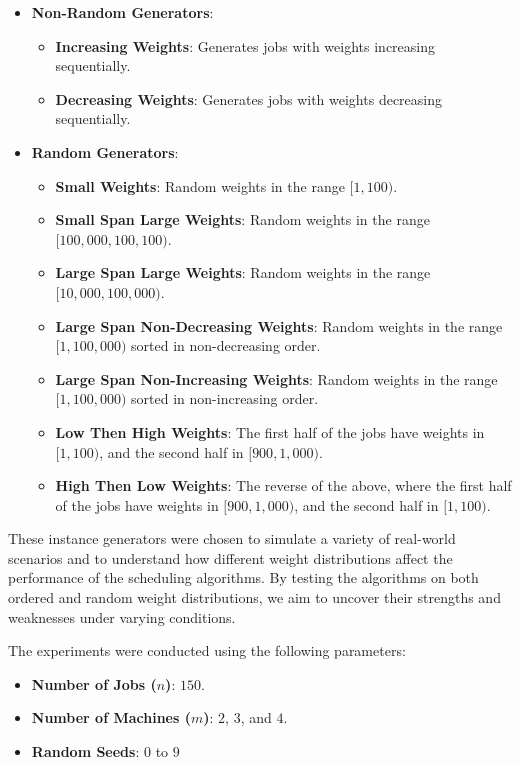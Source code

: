 \begin{itemize}
    \item \textbf{Non-Random Generators}:
    \begin{itemize}
        \item \textbf{Increasing Weights}: Generates jobs with weights increasing sequentially.
        \item \textbf{Decreasing Weights}: Generates jobs with weights decreasing sequentially.
    \end{itemize}
    \item \textbf{Random Generators}:
    \begin{itemize}
        \item \textbf{Small Weights}: Random weights in the range $[1, 100)$.
        \item \textbf{Small Span Large Weights}: Random weights in the range $[100{,}000, 100{,}100)$.
        \item \textbf{Large Span Large Weights}: Random weights in the range $[10{,}000, 100{,}000)$.
        \item \textbf{Large Span Non-Decreasing Weights}: Random weights in the range $[1, 100{,}000)$ sorted in non-decreasing order.
        \item \textbf{Large Span Non-Increasing Weights}: Random weights in the range $[1, 100{,}000)$ sorted in non-increasing order.
        \item \textbf{Low Then High Weights}: The first half of the jobs have weights in $[1, 100)$, and the second half in $[900, 1{,}000)$.
        \item \textbf{High Then Low Weights}: The reverse of the above, where the first half of the jobs have weights in $[900, 1{,}000)$, and the second half in $[1, 100)$.
    \end{itemize}
\end{itemize}

These instance generators were chosen to simulate a variety of real-world scenarios and to understand how different weight distributions affect the performance of the scheduling algorithms. By testing the algorithms on both ordered and random weight distributions, we aim to uncover their strengths and weaknesses under varying conditions.

The experiments were conducted using the following parameters:

\begin{itemize}
    \item \textbf{Number of Jobs ($n$)}: $150$.
    \item \textbf{Number of Machines ($m$)}: $2$, $3$, and $4$.
    \item \textbf{Random Seeds}: $0$ to $9$
\end{itemize}


